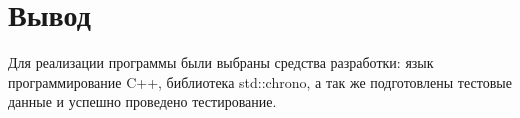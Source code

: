 \section{Вывод}
Для реализации программы были выбраны средства разработки: язык программирование C++, библиотека std::chrono, а так же подготовлены тестовые данные и успешно проведено тестирование.


